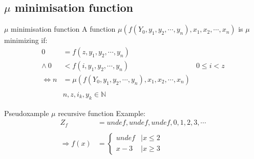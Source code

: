 \documentclass[]{beamer}
\begin{document}
\subsection{$\mu$ minimisation function}

\begin{frame}{$\mu$ minimisation function}
A function $\mu(f(Y_0,y_1,y_2,\cdots,y_n),x_1,x_2,\cdots,x_n)$ is $\mu$ minimizing if: \\
\begin{align*}
0 &= f(z,y_1,y_2,\cdots,y_n) \\
\wedge~ 0 &< f(i,y_1,y_2,\cdots,y_n) &0\leqslant i< z\\
\Longleftrightarrow n &= \mu(f(Y_0,y_1,y_2,\cdots,y_n),x_1,x_2,\cdots,x_n) \\
\\
&n,z,i_k,y_k \in \mathbb{N}
\end{align*}
\end{frame}

\begin{frame}{Pseudoxample $\mu$ recursive function}
Example:
\begin{align*}
Z_f &= undef,undef,undef,0,1,2,3,\cdots\\
\\
\Longrightarrow f(x) &=
\begin{cases}
undef &| x\leqslant 2\\
x-3 &| x \geqslant 3
\end{cases}
\end{align*}
\end{frame}
\end{document}
